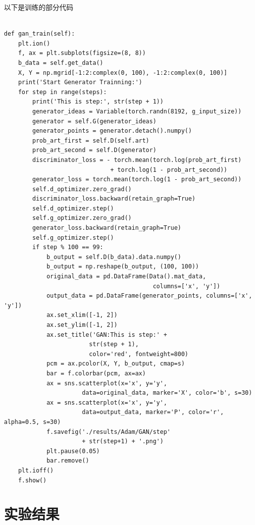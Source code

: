 \documentclass[12pt, a4paper]{report}
\begin{document}
以下是训练的部分代码
\small
\begin{verbatim}

def gan_train(self):
    plt.ion()
    f, ax = plt.subplots(figsize=(8, 8))
    b_data = self.get_data()
    X, Y = np.mgrid[-1:2:complex(0, 100), -1:2:complex(0, 100)]
    print('Start Generator Trainning:')
    for step in range(steps):
        print('This is step:', str(step + 1))
        generator_ideas = Variable(torch.randn(8192, g_input_size))
        generator = self.G(generator_ideas)
        generator_points = generator.detach().numpy()
        prob_art_first = self.D(self.art)
        prob_art_second = self.D(generator)
        discriminator_loss = - torch.mean(torch.log(prob_art_first) 
                              + torch.log(1 - prob_art_second))
        generator_loss = torch.mean(torch.log(1 - prob_art_second))
        self.d_optimizer.zero_grad()
        discriminator_loss.backward(retain_graph=True)
        self.d_optimizer.step()
        self.g_optimizer.zero_grad()
        generator_loss.backward(retain_graph=True)
        self.g_optimizer.step()
        if step % 100 == 99:
            b_output = self.D(b_data).data.numpy()
            b_output = np.reshape(b_output, (100, 100))
            original_data = pd.DataFrame(Data().mat_data, 
                                          columns=['x', 'y'])
            output_data = pd.DataFrame(generator_points, columns=['x', 'y'])
            ax.set_xlim([-1, 2])
            ax.set_ylim([-1, 2])
            ax.set_title('GAN:This is step:' + 
                        str(step + 1), 
                        color='red', fontweight=800)
            pcm = ax.pcolor(X, Y, b_output, cmap=s)
            bar = f.colorbar(pcm, ax=ax)
            ax = sns.scatterplot(x='x', y='y', 
                      data=original_data, marker='X', color='b', s=30)
            ax = sns.scatterplot(x='x', y='y', 
                      data=output_data, marker='P', color='r', alpha=0.5, s=30)
            f.savefig('./results/Adam/GAN/step' 
                      + str(step+1) + '.png')
            plt.pause(0.05)
            bar.remove()
    plt.ioff()
    f.show()

\end{verbatim}

\normalsize
\section{实验结果}
\end{document}
